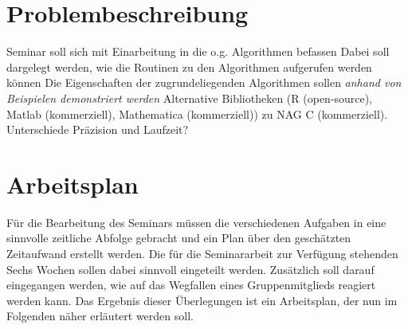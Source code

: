 \documentclass{article}
\begin{document}
\section{Problembeschreibung}
Seminar soll sich mit Einarbeitung in die o.g. Algorithmen befassen
Dabei soll dargelegt werden, wie die Routinen zu den Algorithmen aufgerufen werden können
Die Eigenschaften der zugrundeliegenden Algorithmen sollen \emph{anhand von Beispielen demonstriert werden}
Alternative Bibliotheken (R (open-source), Matlab (kommerziell), Mathematica (kommerziell)) zu NAG C (kommerziell).
Unterschiede Präzision und Laufzeit?

\section{Arbeitsplan}
Für die Bearbeitung des Seminars müssen die verschiedenen Aufgaben in eine sinnvolle zeitliche Abfolge gebracht und ein Plan über den geschätzten Zeitaufwand erstellt werden.
Die für die Seminararbeit zur Verfügung stehenden Sechs Wochen sollen dabei sinnvoll eingeteilt werden.
Zusätzlich soll darauf eingegangen werden, wie auf das Wegfallen eines Gruppenmitglieds reagiert werden kann.
Das Ergebnis dieser Überlegungen ist ein Arbeitsplan, der nun im Folgenden näher erläutert werden soll.
\end{document}

